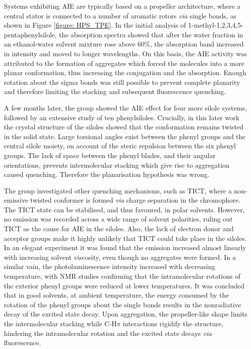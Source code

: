 Systems exhibiting \ac{AIE} are typically based on a propeller architecture, where a central stator is connected to a number of aromatic rotors \textit{via} single bonds, as shown in Figure \ref{figure: HPS_TPE}. In the initial analysis of 1-methyl-1,2,3,4,5-pentaphenylsilole, the absorption spectra showed that after the water fraction in an ethanol-water solvent mixture rose above 60\%, the absorption band increased in intensity and moved to longer wavelengths.\cite{Luo2001} On this basis, the \ac{AIE} activity was attributed to the formation of aggregates which forced the molecules into a more planar conformation, thus increasing the conjugation and the absorption. Enough rotation about the sigma bonds was still possible to prevent complete planarity and therefore limiting the stacking and subsequent fluorescence quenching. 

A few months later, the group showed the \ac{AIE} effect for four more silole systems, followed by an extensive study of ten phenylsiloles.\cite{Tang2001,Chen2003} Crucially, in this later work the crystal structure of the siloles showed that the conformation remains twisted in the solid state.\cite{Chen2003} Large torsional angles exist between the phenyl groups and the central silole moiety, on account of the steric repulsion between the six phenyl groups. The lack of space between the phenyl blades, and their angular orientations, prevents intermolecular stacking which give rise to aggregation caused quenching. Therefore the planarisation hypothesis was wrong. 

The group investigated other quenching mechanisms, such as \ac{TICT}, where a non-emissive twisted conformer is formed \textit{via} charge separation in the chromophore. The \ac{TICT} state can be stabilised, and thus favoured, in polar solvents. However, no emission was recorded across a wide range of solvent polarities, ruling out \ac{TICT} as the cause for \ac{AIE} in the siloles. Also, the lack of electron donor and acceptor groups make it highly unlikely that \ac{TICT} could take place in the siloles. In an elegant experiment it was found that the emission increased almost linearly with increasing solvent viscosity, even though no aggregates were formed. In a similar vain, the photoluminescence intensity increased with decreasing temperature, with NMR studies confirming that the intramolecular rotations of the exterior phenyl groups were reduced at lower temperatures. It was concluded that in good solvents, at ambient temperature, the energy consumed by the rotation of the phenyl groups about the single bonds results in the nonradiative decay of the excited state decay. Upon aggregation, the propeller-like shape limits the intermolecular stacking while C-H\textperiodcentered\textperiodcentered\textperiodcentered$\pi$ interactions rigidify the structure, hindering the intramolecular rotation and the excited state decays \textit{via} fluorescence.\cite{Chen2003}

